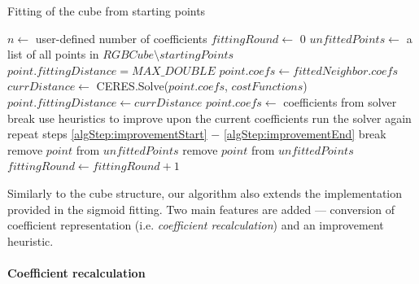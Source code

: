 \begin{algorithm}[t!]
	\caption{Fitting of the cube from starting points}
	\label{alg:upliftingAlgMoments}
	\begin{algorithmic}[1]
		\State $n \gets $ user-defined number of coefficients
		\State $fittingRound \gets$ $0$
		\State $unfittedPoints \gets$ a list of all points in $RGBCube \setminus startingPoints$
		\State $point.fittingDistance = MAX\_DOUBLE$
		\EndFor
		\State $point.coefs \gets fittedNeighbor.coefs$
		 \label{algStep:conversionBegin}
		 \label{algStep:conversionEnd}
		\EndIf 
		\State $currDistance \gets $ CERES.Solve($point.coefs$, $costFunctions$)
		 \label{algStep:improvementStart}
		\State $point.fittingDistance \gets currDistance$
		\State $point.coefs \gets $ coefficients from solver
		\EndIf
		\State break
		\EndIf \label{algStep:improvementEnd}
		\EndFor
		 \label{algStep:heuristicsStart}
		\State use heuristics to improve upon the current coefficients
		\State run the solver again
		\State repeat steps \ref{algStep:improvementStart} $-$ \ref{algStep:improvementEnd}
		\State break \label{algStep:heuristicsEnd}
		\EndIf
		\EndWhile
		\State remove $point$ from $unfittedPoints$
		\EndIf
		\State remove $point$ from $unfittedPoints$
		\EndIf
		\EndFor	
		\State $fittingRound \gets fittingRound+1$
		\EndWhile
	\end{algorithmic}
\end{algorithm}

Similarly to the cube structure, our algorithm also extends the implementation provided in the sigmoid fitting. Two main features are added --- conversion of coefficient representation (i.e. \emph{coefficient recalculation}) and an improvement heuristic.

\paragraph{Coefficient recalculation}


